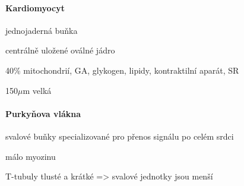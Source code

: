 \documentclass[DIV=8]{scrreprt}
\begin{document}
\paragraph{Kardiomyocyt}
\begin{myItemize}[nosep]
    \item jednojaderná buňka
    \item centrálně uložené oválné jádro
    \item 40\% mitochondrií, GA, glykogen, lipidy, kontraktilní aparát, SR
    \item 150\(\mu\)m velká
\end{myItemize}



\paragraph{Purkyňova vlákna}
\begin{myItemize}[nosep]
    \item svalové buňky specializované pro přenos signálu po celém srdci
    \item málo myozinu
    \item T-tubuly tlusté a krátké => svalové jednotky jsou menší
\end{myItemize}
\end{document}
